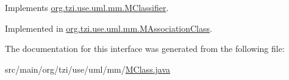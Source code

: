 Implements \hyperlink{interfaceorg_1_1tzi_1_1use_1_1uml_1_1mm_1_1_m_classifier_abdf1bae3e55d8f38f14710d21b4c9fb7}{org.\-tzi.\-use.\-uml.\-mm.\-M\-Classifier}.



Implemented in \hyperlink{interfaceorg_1_1tzi_1_1use_1_1uml_1_1mm_1_1_m_association_class_ae5e755e01a6d8e4db34bdaf9d015655f}{org.\-tzi.\-use.\-uml.\-mm.\-M\-Association\-Class}.



The documentation for this interface was generated from the following file\-:\begin{DoxyCompactItemize}
\item 
src/main/org/tzi/use/uml/mm/\hyperlink{_m_class_8java}{M\-Class.\-java}\end{DoxyCompactItemize}
